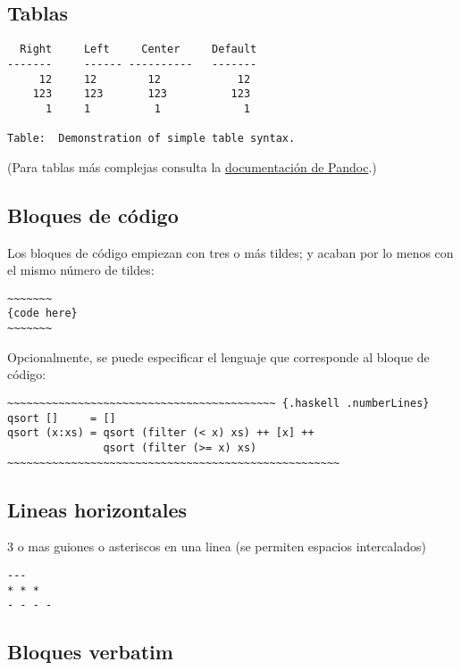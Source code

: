 \documentclass[
  12pt,
  spanish,
]{article}
\begin{document}
\hypertarget{tablas}{%
\subsection{Tablas}\label{tablas}}

\begin{verbatim}
  Right     Left     Center     Default
-------     ------ ----------   -------
     12     12        12            12
    123     123       123          123
      1     1          1             1

Table:  Demonstration of simple table syntax.
\end{verbatim}

(Para tablas más complejas consulta la
\href{http://pandoc.org/README.html\#tables}{documentación de Pandoc}.)

\hypertarget{bloques-de-cuxf3digo}{%
\subsection{Bloques de código}\label{bloques-de-cuxf3digo}}

Los bloques de código empiezan con tres o más tildes; y acaban por lo
menos con el mismo número de tildes:

\begin{verbatim}
~~~~~~~
{code here}
~~~~~~~
\end{verbatim}

Opcionalmente, se puede especificar el lenguaje que corresponde al
bloque de código:

\begin{verbatim}
~~~~~~~~~~~~~~~~~~~~~~~~~~~~~~~~~~~~~~~~~~ {.haskell .numberLines}
qsort []     = []
qsort (x:xs) = qsort (filter (< x) xs) ++ [x] ++
               qsort (filter (>= x) xs)
~~~~~~~~~~~~~~~~~~~~~~~~~~~~~~~~~~~~~~~~~~~~~~~~~~~~
\end{verbatim}

\hypertarget{lineas-horizontales}{%
\subsection{Lineas horizontales}\label{lineas-horizontales}}

3 o mas guiones o asteriscos en una linea (se permiten espacios
intercalados)

\begin{verbatim}
---
* * *
- - - -
\end{verbatim}

\hypertarget{bloques-verbatim}{%
\subsection{Bloques verbatim}\label{bloques-verbatim}}
\end{document}
